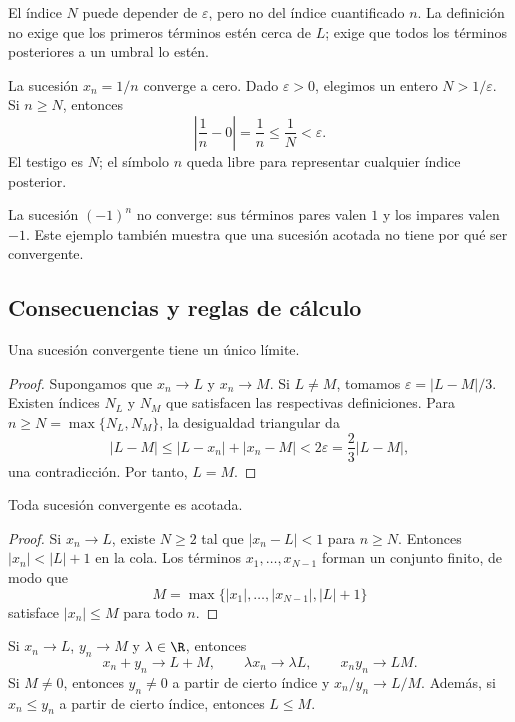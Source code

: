 El índice \(N\) puede depender de \(\varepsilon\), pero no del índice
cuantificado \(n\). La definición no exige que los primeros términos estén
cerca de \(L\); exige que todos los términos posteriores a un umbral lo estén.

\begin{ejemplo}
La sucesión \(x_n=1/n\) converge a cero. Dado \(\varepsilon>0\), elegimos un
entero \(N>1/\varepsilon\). Si \(n\ge N\), entonces
\[
  \left|\frac1n-0\right|=\frac1n\le\frac1N<\varepsilon.
\]
El testigo es \(N\); el símbolo \(n\) queda libre para representar cualquier
índice posterior.
\end{ejemplo}

La sucesión \((-1)^n\) no converge: sus términos pares valen \(1\) y los
impares valen \(-1\). Este ejemplo también muestra que una sucesión acotada no
tiene por qué ser convergente.

\subsection{Consecuencias y reglas de cálculo}

\begin{teorema}
Una sucesión convergente tiene un único límite.
\end{teorema}

\begin{proof}
Supongamos que \(x_n\to L\) y \(x_n\to M\). Si \(L\ne M\), tomamos
\(\varepsilon=|L-M|/3\). Existen índices \(N_L\) y \(N_M\) que satisfacen
las respectivas definiciones. Para
\(n\ge N=\max\{N_L,N_M\}\), la desigualdad triangular da
\[
 |L-M|\le |L-x_n|+|x_n-M|<2\varepsilon
 =\frac23|L-M|,
\]
una contradicción. Por tanto, \(L=M\).
\end{proof}

\begin{proposicion}[Acotación]
Toda sucesión convergente es acotada.
\end{proposicion}

\begin{proof}
Si \(x_n\to L\), existe \(N\ge2\) tal que \(|x_n-L|<1\) para \(n\ge N\).
Entonces \(|x_n|<|L|+1\) en la cola. Los términos
\(x_1,\ldots,x_{N-1}\) forman un conjunto finito, de modo que
\[
 M=\max\{|x_1|,\ldots,|x_{N-1}|,|L|+1\}
\]
satisface \(|x_n|\le M\) para todo \(n\).
\end{proof}

\begin{teorema}
Si \(x_n\to L\), \(y_n\to M\) y \(\lambda\in\R\), entonces
\[
 x_n+y_n\to L+M,\qquad
 \lambda x_n\to\lambda L,\qquad
 x_ny_n\to LM.
\]
Si \(M\ne0\), entonces \(y_n\ne0\) a partir de cierto índice y
\(x_n/y_n\to L/M\). Además, si \(x_n\le y_n\) a partir de cierto índice,
entonces \(L\le M\).
\end{teorema}

